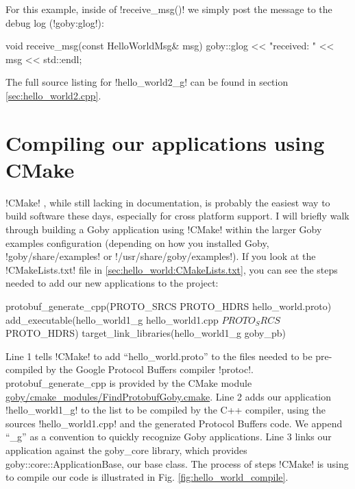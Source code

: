 For this example, inside of !receive_msg()! we simply post the message to the debug log (!goby:glog!):

\begin{boxedverbatim}
void receive_msg(const HelloWorldMsg& msg)
{
   goby::glog << "received: " << msg << std::endl;
}
\end{boxedverbatim}
\resetbvlinenumber

The full source listing for !hello_world2_g! can be found in section \ref{sec:hello_world2.cpp}.

\section{Compiling our applications using CMake}

!CMake! \cite{cmake}, while still lacking in documentation, is probably the easiest way to build software these days, especially for cross platform support. I will briefly walk through building a Goby application using !CMake! within the larger Goby examples configuration (depending on how you installed Goby, !goby/share/examples! or !/usr/share/goby/examples!). If you look at the !CMakeLists.txt! file in \ref{sec:hello_world:CMakeLists.txt}, you can see the steps needed to add our new applications to the project:

\begin{boxedverbatim}
protobuf_generate_cpp(PROTO_SRCS PROTO_HDRS hello_world.proto)
add_executable(hello_world1_g hello_world1.cpp ${PROTO_SRCS} ${PROTO_HDRS})
target_link_libraries(hello_world1_g goby_pb)
\end{boxedverbatim}
\resetbvlinenumber

Line 1 tells !CMake! to add ``hello\_world.proto'' to the files needed to be pre-compiled by the Google Protocol Buffers compiler !protoc!. protobuf\_generate\_cpp is provided by the CMake module \href{http://bazaar.launchpad.net/~goby-dev/goby/trunk/annotate/head:/cmake_modules/FindProtobufGoby.cmake}{goby/cmake\_modules/FindProtobufGoby.cmake}. Line 2 adds our application !hello_world1_g! to the list to be compiled by the C++ compiler, using the sources !hello_world1.cpp! and the generated Protocol Buffers code. We append ``\_g'' as a convention to quickly recognize Goby applications. Line 3 links our application against the goby\_core library, which provides goby::core::ApplicationBase, our base class. The process of steps !CMake! is using to compile our code is illustrated in Fig. \ref{fig:hello_world_compile}.

